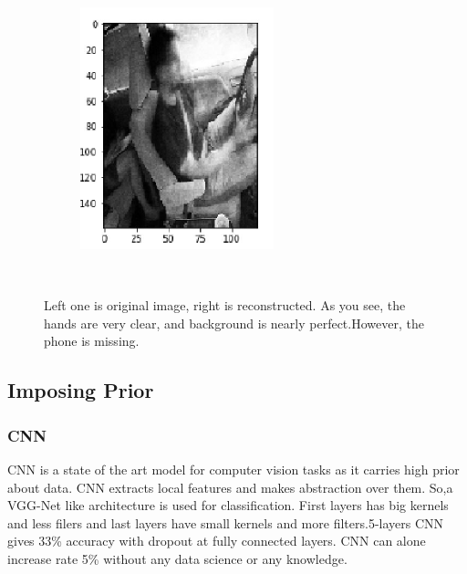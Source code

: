 \documentclass[12pt, letterpaper]{article}
\begin{document}
\begin{figure}[H]
\begin{subfigure}[b]{0.3\textwidth}
        \includegraphics[width=\textwidth]{vae-1r.png}
        \label{fig:tiger}
    \end{subfigure}
    ~ %
    \caption{Left one is original image, right is reconstructed. As you see, the hands are very clear, and background is nearly perfect.However, the phone is missing. }
  \label{fig:animals}
\end{figure}
\subsection{Imposing Prior}

\subsubsection{CNN}
		CNN is a state of the art model for computer vision tasks as it carries high prior about data. CNN extracts local features and makes abstraction over them. So,a VGG-Net like architecture is used for classification. First layers has big kernels and less filers and last layers have small kernels and more filters.5-layers CNN gives 33\% accuracy with dropout at fully connected layers. CNN can alone increase rate 5\% without any data science or any knowledge.
\end{document}
